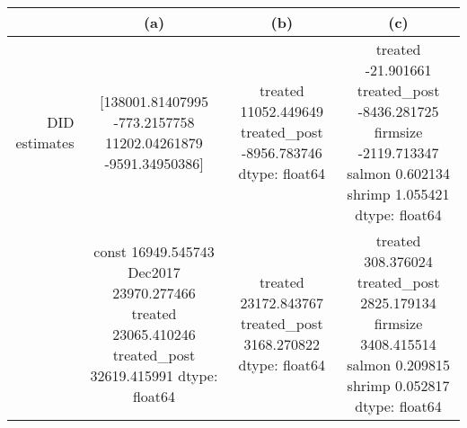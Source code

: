 \begin{tabular}{rccc}
\toprule
 & (a) & (b) & (c) \\
\midrule
DID estimates & [138001.81407995   -773.2157758   11202.04261879  -9591.34950386] & treated         11052.449649
treated_post    -8956.783746
dtype: float64 & treated          -21.901661
treated_post   -8436.281725
firmsize       -2119.713347
salmon             0.602134
shrimp             1.055421
dtype: float64 \\
  & const           16949.545743
Dec2017         23970.277466
treated         23065.410246
treated_post    32619.415991
dtype: float64 & treated         23172.843767
treated_post     3168.270822
dtype: float64 & treated          308.376024
treated_post    2825.179134
firmsize        3408.415514
salmon             0.209815
shrimp             0.052817
dtype: float64 \\
\bottomrule
\end{tabular}
